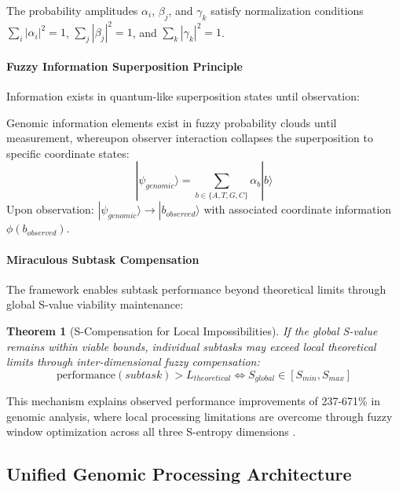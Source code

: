 \documentclass[12pt,a4paper]{article}
\newtheorem{theorem}{Theorem}
\begin{document}
The probability amplitudes $\alpha_i$, $\beta_j$, and $\gamma_k$ satisfy normalization conditions $\sum_i |\alpha_i|^2 = 1$, $\sum_j |\beta_j|^2 = 1$, and $\sum_k |\gamma_k|^2 = 1$.

\paragraph{Fuzzy Information Superposition Principle}

Information exists in quantum-like superposition states until observation:

\begin{principle}
Genomic information elements exist in fuzzy probability clouds until measurement, whereupon observer interaction collapses the superposition to specific coordinate states:
\begin{equation}
|\psi_{genomic}\rangle = \sum_{b \in \{A,T,G,C\}} \alpha_b |b\rangle
\end{equation}
Upon observation: $|\psi_{genomic}\rangle \rightarrow |b_{observed}\rangle$ with associated coordinate information $\phi(b_{observed})$.
\end{principle}

\paragraph{Miraculous Subtask Compensation}

The framework enables subtask performance beyond theoretical limits through global S-value viability maintenance:

\begin{theorem}[S-Compensation for Local Impossibilities]
If the global S-value remains within viable bounds, individual subtasks may exceed local theoretical limits through inter-dimensional fuzzy compensation:
\begin{equation}
\text{performance}(subtask) > L_{theoretical} \iff S_{global} \in [S_{min}, S_{max}]
\end{equation}
\end{theorem}

This mechanism explains observed performance improvements of 237-671\% in genomic analysis, where local processing limitations are overcome through fuzzy window optimization across all three S-entropy dimensions \cite{sachikonye2024sentropy}.

\subsection{Unified Genomic Processing Architecture}
\end{document}
